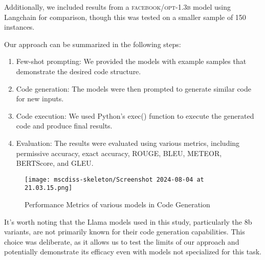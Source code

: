 \documentclass[logo,msc]{infthesis}           %
\begin{document}
Additionally, we included results from a \textsc{facebook/opt-1.3b} model using Langchain for comparison, though this was tested on a smaller sample of 150 instances.

Our approach can be summarized in the following steps:
\begin{enumerate}
   \item Few-shot prompting: We provided the models with example samples that demonstrate the desired code structure.
   \item Code generation: The models were then prompted to generate similar code for new inputs.
   \item Code execution: We used Python's exec() function to execute the generated code and produce final results.
   \item Evaluation: The results were evaluated using various metrics, including permissive accuracy, exact accuracy, ROUGE, BLEU, METEOR, BERTScore, and GLEU.
\end{enumerate}
\begin{figure}[h!] 
    \centering 
    \texttt{[image: mscdiss-skeleton/Screenshot 2024-08-04 at 21.03.15.png]} 
    \caption{Performance Metrics of various models in Code Generation} 
    \label{fig:my_label} 
\end{figure}
It's worth noting that the Llama models used in this study, particularly the 8b variants, are not primarily known for their code generation capabilities. This choice was deliberate, as it allows us to test the limits of our approach and potentially demonstrate its efficacy even with models not specialized for this task.
\end{document}
